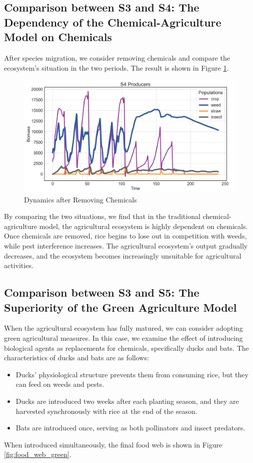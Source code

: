 \documentclass{HZNUMCM}
\begin{document}
      \subsection{Comparison between S3 and S4: The Dependency of the Chemical-Agriculture Model on Chemicals}
      After species migration, we consider removing chemicals and compare the ecosystem's situation in the two periods. 
      The result is shown in Figure \ref{fig:S4}.
      \begin{figure}
        \centering
        \includegraphics[width=0.7\linewidth]{images/P4_producers.png}
        \caption{Dynamics after Removing Chemicals}
        \label{fig:S4}
      \end{figure}
      
      By comparing the two situations, we find that in the traditional chemical-agriculture model, 
      the agricultural ecosystem is highly dependent on chemicals. Once chemicals are removed, 
      rice begins to lose out in competition with weeds, while pest interference increases. 
      The agricultural ecosystem's output gradually decreases, 
      and the ecosystem becomes increasingly unsuitable for agricultural activities.
      
      \subsection{Comparison between S3 and S5: The Superiority of the Green Agriculture Model}
        When the agricultural ecosystem has fully matured, 
        we can consider adopting green agricultural measures. In this case, 
        we examine the effect of introducing biological agents as replacements for chemicals, 
        specifically ducks and bats. The characteristics of ducks and bats are as follows:
        \begin{itemize}
            \item Ducks' physiological structure prevents them from consuming rice, but they can feed on weeds and pests.
            \item Ducks are introduced two weeks after each planting season, and they are harvested synchronously with rice at the end of the season.
            \item Bats are introduced once, serving as both pollinators and insect predators.
        \end{itemize}
        When introduced simultaneously, the final food web is shown in Figure \ref{fig:food_web_green}.
        
\end{document}
